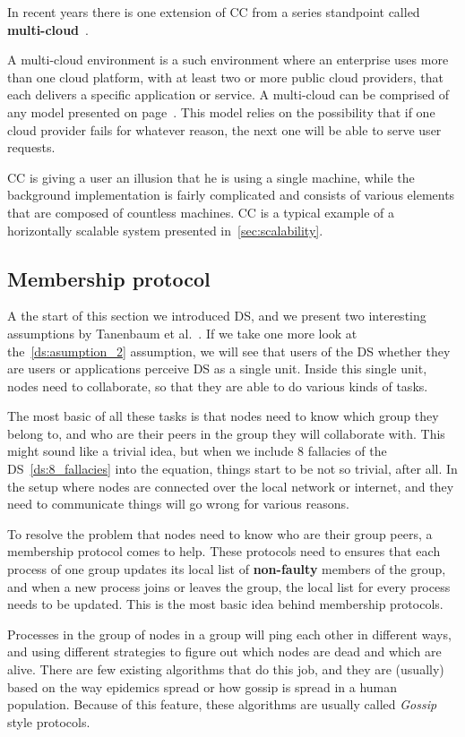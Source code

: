 \noindent
In recent years there is one extension of CC from a series standpoint called \textbf{multi-cloud}~\cite{HongDSH19, Ardagna15}. 

A multi-cloud environment is a such environment where an enterprise uses more than one cloud platform, with at least two or more public cloud providers, that each delivers a specific application or service. A multi-cloud can be comprised of any model presented on page~\pageref{sec_types}. This model relies on the possibility that if one cloud provider fails for whatever reason, the next one will be able to serve user requests.

CC is giving a user an illusion that he is using a single machine, while the background implementation is fairly complicated and consists of various elements that are composed of countless machines. CC is a typical example of a horizontally scalable system presented in~\ref{sec:scalability}.
%
%
\subsection{Membership protocol}\label{sec:memership_protocol}
%
A the start of this section we introduced DS, and we present two interesting assumptions by Tanenbaum et al.~\cite{SteenT16, 0019513}. If we take one more look at the~\ref{ds:asumption_2} assumption, we will see that users of the DS whether they are users or applications perceive DS as a single unit. Inside this single unit, nodes need to collaborate, so that they are able to do various kinds of tasks.

The most basic of all these tasks is that nodes need to know which group they belong to, and who are their peers in the group they will collaborate with. This might sound like a trivial idea, but when we include 8 fallacies of the DS~\ref{ds:8_fallacies} into the equation, things start to be not so trivial, after all. In the setup where nodes are connected over the local network or internet, and they need to communicate things will go wrong for various reasons.

To resolve the problem that nodes need to know who are their group peers, a membership protocol comes to help. These protocols need to ensures that each process of one group updates its local list of \textbf{non-faulty} members of the group, and when a new process joins or leaves the group, the local list for every process needs to be updated. This is the most basic idea behind membership protocols.

Processes in the group of nodes in a group will ping each other in different ways, and using different strategies to figure out which nodes are dead and which are alive. There are few existing algorithms that do this job, and they are (usually) based on the way epidemics spread or how gossip is spread in a human population. Because of this feature, these algorithms are usually called \textit{Gossip} style protocols.

